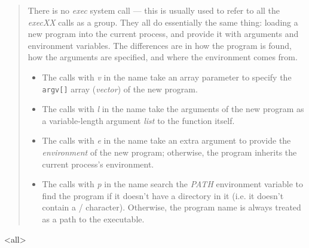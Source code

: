 \begin{quote}
  There is no \emph{exec} system call --- this is usually used to refer to all the
  \emph{execXX} calls as a group. They all do essentially the same thing: loading a new
  program into the current process, and provide it with arguments and environment
  variables. The differences are in how the program is found, how the arguments are
  specified, and where the environment comes from.

  \begin{itemize}
  \item The calls with \emph{v} in the name take an array parameter to specify the
    \texttt{argv[]} array (\emph{vector}) of the new program.
  \item The calls with \emph{l} in the name take the arguments of the new program as a
    variable-length argument \emph{list} to the function itself.
  \item The calls with \emph{e} in the name take an extra argument to provide the
    \emph{environment} of the new program; otherwise, the program inherits the current
    process's environment.
  \item The calls with \emph{p} in the name search the \emph{PATH} environment variable to
    find the program if it doesn't have a directory in it (i.e. it doesn't contain a /
    character). Otherwise, the program name is always treated as a path to the executable.
  \end{itemize}
\end{quote}

\mode<all>

